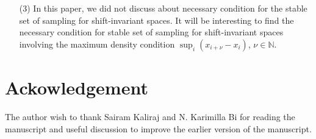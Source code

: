 \documentclass[a4paper,12pt,reqno]{amsart}
\theoremstyle{plain}
\numberwithin{equation}{section}
\theoremstyle{definition}
\begin{document}
\begin{itemize}
\item [(3)] In this paper, we did not discuss about  necessary condition for the stable set of sampling for shift-invariant spaces. It will be interesting to 
find the necessary condition for stable set of sampling for shift-invariant spaces involving the maximum density condition $\sup_{i}(x_{i+\nu}-x_i)$, $\nu\in\mathbb{N}$.
\end{itemize}




\section*{Ackowledgement}
The author  wish to thank  Sairam Kaliraj and N. Karimilla Bi  for reading the manuscript and useful discussion to improve the earlier version of the manuscript.
\end{document}

